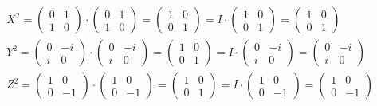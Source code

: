 \documentclass[11pt]{article}
\begin{document}
\begin{enumerate}
\begin{enumerate}
		            \begin{align*}
			             & X^2 =
			            \begin{pmatrix} 0 & 1 \\ 1 & 0 \end{pmatrix}
			            \cdot
			            \begin{pmatrix} 0 & 1 \\ 1 & 0 \end{pmatrix}
			            =
			            \begin{pmatrix} 1 & 0 \\ 0 & 1 \end{pmatrix}
			            = I \cdot
			            \begin{pmatrix} 1 & 0 \\ 0 & 1 \end{pmatrix}
			            =
			            \begin{pmatrix} 1 & 0 \\ 0 & 1 \end{pmatrix}  \\
			             & Y^2 =
			            \begin{pmatrix} 0 & -i \\ i & 0 \end{pmatrix}
			            \cdot
			            \begin{pmatrix} 0 & -i \\ i & 0 \end{pmatrix}
			            =
			            \begin{pmatrix} 1 & 0 \\ 0 & 1 \end{pmatrix}
			            = I \cdot
			            \begin{pmatrix} 0 & -i \\ i & 0 \end{pmatrix}
			            =
			            \begin{pmatrix} 0 & -i \\ i & 0 \end{pmatrix} \\
			             & Z^2 =
			            \begin{pmatrix} 1 & 0 \\ 0 & -1 \end{pmatrix}
			            \cdot
			            \begin{pmatrix} 1 & 0 \\ 0 & -1 \end{pmatrix}
			            =
			            \begin{pmatrix} 1 & 0 \\ 0 & 1 \end{pmatrix}
			            = I \cdot
			            \begin{pmatrix} 1 & 0 \\ 0 & -1 \end{pmatrix}
			            =
			            \begin{pmatrix} 1 & 0 \\ 0 & -1 \end{pmatrix}
		            \end{align*}


\end{enumerate}
\end{enumerate}
\end{document}
